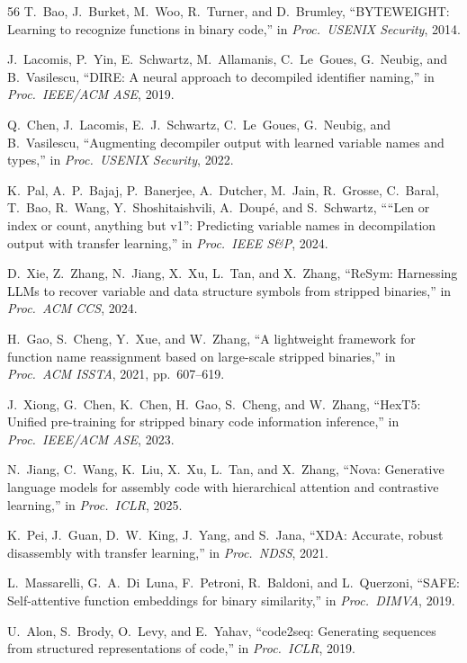 \documentclass[sigconf,nonacm]{acmart}
\begin{document}
{\begin{thebibliography}{56}
T.~Bao, J.~Burket, M.~Woo, R.~Turner, and D.~Brumley, ``BYTEWEIGHT: Learning to recognize functions in binary code,'' in \emph{Proc.\ USENIX Security}, 2014.

J.~Lacomis, P.~Yin, E.~Schwartz, M.~Allamanis, C.~Le~Goues, G.~Neubig, and B.~Vasilescu, ``DIRE: A neural approach to decompiled identifier naming,'' in \emph{Proc.\ IEEE/ACM ASE}, 2019.

Q.~Chen, J.~Lacomis, E.~J.~Schwartz, C.~Le~Goues, G.~Neubig, and B.~Vasilescu, ``Augmenting decompiler output with learned variable names and types,'' in \emph{Proc.\ USENIX Security}, 2022.

K.~Pal, A.~P.~Bajaj, P.~Banerjee, A.~Dutcher, M.~Jain, R.~Grosse, C.~Baral, T.~Bao, R.~Wang, Y.~Shoshitaishvili, A.~Doup\'{e}, and S.~Schwartz, ````Len or index or count, anything but v1'': Predicting variable names in decompilation output with transfer learning,'' in \emph{Proc.\ IEEE S\&P}, 2024.

D.~Xie, Z.~Zhang, N.~Jiang, X.~Xu, L.~Tan, and X.~Zhang, ``ReSym: Harnessing LLMs to recover variable and data structure symbols from stripped binaries,'' in \emph{Proc.\ ACM CCS}, 2024.

H.~Gao, S.~Cheng, Y.~Xue, and W.~Zhang, ``A lightweight framework for function name reassignment based on large-scale stripped binaries,'' in \emph{Proc.\ ACM ISSTA}, 2021, pp.~607--619.

J.~Xiong, G.~Chen, K.~Chen, H.~Gao, S.~Cheng, and W.~Zhang, ``HexT5: Unified pre-training for stripped binary code information inference,'' in \emph{Proc.\ IEEE/ACM ASE}, 2023.

N.~Jiang, C.~Wang, K.~Liu, X.~Xu, L.~Tan, and X.~Zhang, ``Nova: Generative language models for assembly code with hierarchical attention and contrastive learning,'' in \emph{Proc.\ ICLR}, 2025.

K.~Pei, J.~Guan, D.~W.~King, J.~Yang, and S.~Jana, ``XDA: Accurate, robust disassembly with transfer learning,'' in \emph{Proc.\ NDSS}, 2021.

L.~Massarelli, G.~A.~Di~Luna, F.~Petroni, R.~Baldoni, and L.~Querzoni, ``SAFE: Self-attentive function embeddings for binary similarity,'' in \emph{Proc.\ DIMVA}, 2019.

U.~Alon, S.~Brody, O.~Levy, and E.~Yahav, ``code2seq: Generating sequences from structured representations of code,'' in \emph{Proc.\ ICLR}, 2019.


\end{thebibliography}}
\end{document}
